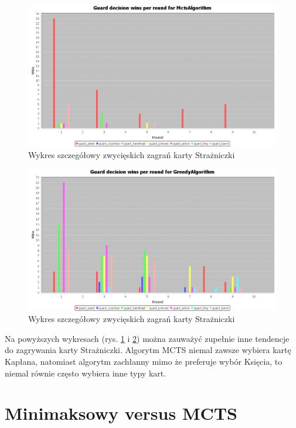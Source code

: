 \begin{figure}[H]
	\centering
	\includegraphics[width=\textwidth]{Resources/MirrorMctsVg/MctsVsGGuardDecision.PNG}
	\caption{Wykres szczegółowy zwycięskich zagrań karty Strażniczki} 
	\label{fig:MctsVsGGuardDecision}
\end{figure}

\begin{figure}[H]
	\centering
	\includegraphics[width=\textwidth]{Resources/MirrorMctsVg/GVsMctsGuardDecision.PNG}
	\caption{Wykres szczegółowy zwycięskich zagrań karty Strażniczki} 
	\label{fig:GVsMctsGuardDecision}
\end{figure}

Na powyższych wykresach (rys. \ref{fig:MctsVsGGuardDecision} i \ref{fig:GVsMctsGuardDecision}) można zauważyć zupełnie inne tendencje do zagrywania karty Strażniczki. Algorytm MCTS niemal zawsze wybiera kartę Kapłana, natomiast algorytm zachłanny mimo że preferuje wybór Księcia, to niemal równie często wybiera inne typy kart.

\section{Minimaksowy versus MCTS}


